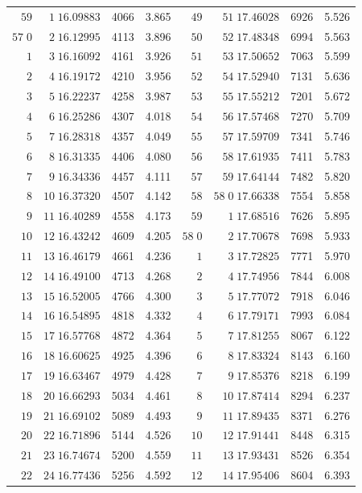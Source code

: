 \begin{center}
\begin{tabular}{|r|r|r|r||r|r|r|r|}
\(59\)&\(1\;16.09883\)&4066&3.865&\(49\)&\(51\;17.46028\)&6926&5.526\\[3pt]
\(57\;0\)&\(2\;16.12995\)&4113&3.896&\(50\)&\(52\;17.48348\)&6994&5.563\\
\(1\)&\(3\;16.16092\)&4161&3.926&\(51\)&\(53\;17.50652\)&7063&5.599\\
\(2\)&\(4\;16.19172\)&4210&3.956&\(52\)&\(54\;17.52940\)&7131&5.636\\
\(3\)&\(5\;16.22237\)&4258&3.987&\(53\)&\(55\;17.55212\)&7201&5.672\\
\(4\)&\(6\;16.25286\)&4307&4.018&\(54\)&\(56\;17.57468\)&7270&5.709\\
\(5\)&\(7\;16.28318\)&4357&4.049&\(55\)&\(57\;17.59709\)&7341&5.746\\
\(6\)&\(8\;16.31335\)&4406&4.080&\(56\)&\(58\;17.61935\)&7411&5.783\\
\(7\)&\(9\;16.34336\)&4457&4.111&\(57\)&\(59\;17.64144\)&7482&5.820\\
\(8\)&\(10\;16.37320\)&4507&4.142&\(58\)&\(58\;0\;17.66338\)&7554&5.858\\
\(9\)&\(11\;16.40289\)&4558&4.173&\(59\)&\(1\;17.68516\)&7626&5.895\\[3pt]
\(10\)&\(12\;16.43242\)&4609&4.205&\(58\;0\)&\(2\;17.70678\)&7698&5.933\\
\(11\)&\(13\;16.46179\)&4661&4.236&\(1\)&\(3\;17.72825\)&7771&5.970\\
\(12\)&\(14\;16.49100\)&4713&4.268&\(2\)&\(4\;17.74956\)&7844&6.008\\
\(13\)&\(15\;16.52005\)&4766&4.300&\(3\)&\(5\;17.77072\)&7918&6.046\\
\(14\)&\(16\;16.54895\)&4818&4.332&\(4\)&\(6\;17.79171\)&7993&6.084\\
\(15\)&\(17\;16.57768\)&4872&4.364&\(5\)&\(7\;17.81255\)&8067&6.122\\
\(16\)&\(18\;16.60625\)&4925&4.396&\(6\)&\(8\;17.83324\)&8143&6.160\\
\(17\)&\(19\;16.63467\)&4979&4.428&\(7\)&\(9\;17.85376\)&8218&6.199\\
\(18\)&\(20\;16.66293\)&5034&4.461&\(8\)&\(10\;17.87414\)&8294&6.237\\
\(19\)&\(21\;16.69102\)&5089&4.493&\(9\)&\(11\;17.89435\)&8371&6.276\\[3pt]
\(20\)&\(22\;16.71896\)&5144&4.526&\(10\)&\(12\;17.91441\)&8448&6.315\\
\(21\)&\(23\;16.74674\)&5200&4.559&\(11\)&\(13\;17.93431\)&8526&6.354\\
\(22\)&\(24\;16.77436\)&5256&4.592&\(12\)&\(14\;17.95406\)&8604&6.393\\

\end{tabular}
\end{center}
